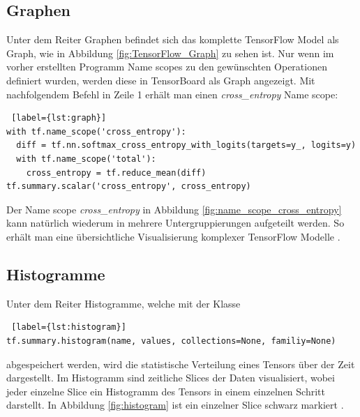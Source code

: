 \subsection{Graphen} \label{sub:tb-graph}
\vspace{10pt}
Unter dem Reiter Graphen befindet sich das komplette TensorFlow Model als Graph,  wie in Abbildung \ref{fig:TensorFlow_Graph} zu sehen ist. Nur wenn im vorher erstellten Programm Name scopes zu den gewünschten Operationen definiert wurden, werden diese in TensorBoard als Graph angezeigt. Mit nachfolgendem Befehl in Zeile 1 erhält man einen \textit{cross\_entropy} Name scope: 
\\

\begin{minipage}{\linewidth}
\begin{lstlisting} [label={lst:graph}]
with tf.name_scope('cross_entropy'):
  diff = tf.nn.softmax_cross_entropy_with_logits(targets=y_, logits=y)
  with tf.name_scope('total'):
    cross_entropy = tf.reduce_mean(diff)
tf.summary.scalar('cross_entropy', cross_entropy)
\end{lstlisting}
\end{minipage}
\vspace{0.2cm}

Der Name scope \textit{cross\_entropy} in Abbildung \ref{fig:name_scope_cross_entropy} kann natürlich wiederum in mehrere Untergruppierungen aufgeteilt werden. So erhält man eine übersichtliche Visualisierung komplexer TensorFlow Modelle \cite{tensorboard.2017}.






\subsection{Histogramme}
\vspace{10pt}
Unter dem Reiter Histogramme, welche mit der Klasse
\\

\begin{minipage}{\linewidth}
\begin{lstlisting} [label={lst:histogram}]
tf.summary.histogram(name, values, collections=None, familiy=None)
\end{lstlisting}
\end{minipage}
\vspace{0.2cm}


abgespeichert werden, wird die statistische Verteilung eines Tensors über der Zeit dargestellt. Im Histogramm sind zeitliche \dq Slices\grqq{} der Daten visualisiert, wobei jeder einzelne Slice ein Histogramm des Tensors in einem einzelnen Schritt darstellt. In Abbildung \ref{fig:histogram} ist ein einzelner Slice schwarz markiert \cite{tensorboard.2017}.

